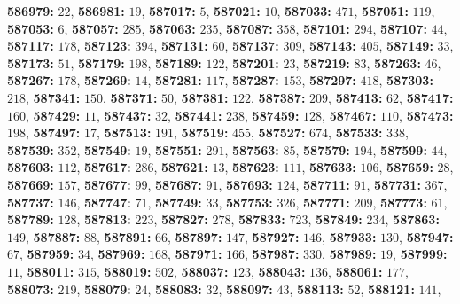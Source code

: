 \textsf{\bfseries 586979:} $22$, \textsf{\bfseries 586981:} $19$, \textsf{\bfseries 587017:} $5$, \textsf{\bfseries 587021:} $10$, \textsf{\bfseries 587033:} $471$, \textsf{\bfseries 587051:} $119$, \textsf{\bfseries 587053:} $6$, \textsf{\bfseries 587057:} $285$, \textsf{\bfseries 587063:} $235$, \textsf{\bfseries 587087:} $358$, \textsf{\bfseries 587101:} $294$, \textsf{\bfseries 587107:} $44$, \textsf{\bfseries 587117:} $178$, \textsf{\bfseries 587123:} $394$, \textsf{\bfseries 587131:} $60$, \textsf{\bfseries 587137:} $309$, \textsf{\bfseries 587143:} $405$, \textsf{\bfseries 587149:} $33$, \textsf{\bfseries 587173:} $51$, \textsf{\bfseries 587179:} $198$, \textsf{\bfseries 587189:} $122$, \textsf{\bfseries 587201:} $23$, \textsf{\bfseries 587219:} $83$, \textsf{\bfseries 587263:} $46$, \textsf{\bfseries 587267:} $178$, \textsf{\bfseries 587269:} $14$, \textsf{\bfseries 587281:} $117$, \textsf{\bfseries 587287:} $153$, \textsf{\bfseries 587297:} $418$, \textsf{\bfseries 587303:} $218$, \textsf{\bfseries 587341:} $150$, \textsf{\bfseries 587371:} $50$, \textsf{\bfseries 587381:} $122$, \textsf{\bfseries 587387:} $209$, \textsf{\bfseries 587413:} $62$, \textsf{\bfseries 587417:} $160$, \textsf{\bfseries 587429:} $11$, \textsf{\bfseries 587437:} $32$, \textsf{\bfseries 587441:} $238$, \textsf{\bfseries 587459:} $128$, \textsf{\bfseries 587467:} $110$, \textsf{\bfseries 587473:} $198$, \textsf{\bfseries 587497:} $17$, \textsf{\bfseries 587513:} $191$, \textsf{\bfseries 587519:} $455$, \textsf{\bfseries 587527:} $674$, \textsf{\bfseries 587533:} $338$, \textsf{\bfseries 587539:} $352$, \textsf{\bfseries 587549:} $19$, \textsf{\bfseries 587551:} $291$, \textsf{\bfseries 587563:} $85$, \textsf{\bfseries 587579:} $194$, \textsf{\bfseries 587599:} $44$, \textsf{\bfseries 587603:} $112$, \textsf{\bfseries 587617:} $286$, \textsf{\bfseries 587621:} $13$, \textsf{\bfseries 587623:} $111$, \textsf{\bfseries 587633:} $106$, \textsf{\bfseries 587659:} $28$, \textsf{\bfseries 587669:} $157$, \textsf{\bfseries 587677:} $99$, \textsf{\bfseries 587687:} $91$, \textsf{\bfseries 587693:} $124$, \textsf{\bfseries 587711:} $91$, \textsf{\bfseries 587731:} $367$, \textsf{\bfseries 587737:} $146$, \textsf{\bfseries 587747:} $71$, \textsf{\bfseries 587749:} $33$, \textsf{\bfseries 587753:} $326$, \textsf{\bfseries 587771:} $209$, \textsf{\bfseries 587773:} $61$, \textsf{\bfseries 587789:} $128$, \textsf{\bfseries 587813:} $223$, \textsf{\bfseries 587827:} $278$, \textsf{\bfseries 587833:} $723$, \textsf{\bfseries 587849:} $234$, \textsf{\bfseries 587863:} $149$, \textsf{\bfseries 587887:} $88$, \textsf{\bfseries 587891:} $66$, \textsf{\bfseries 587897:} $147$, \textsf{\bfseries 587927:} $146$, \textsf{\bfseries 587933:} $130$, \textsf{\bfseries 587947:} $67$, \textsf{\bfseries 587959:} $34$, \textsf{\bfseries 587969:} $168$, \textsf{\bfseries 587971:} $166$, \textsf{\bfseries 587987:} $330$, \textsf{\bfseries 587989:} $19$, \textsf{\bfseries 587999:} $11$, \textsf{\bfseries 588011:} $315$, \textsf{\bfseries 588019:} $502$, \textsf{\bfseries 588037:} $123$, \textsf{\bfseries 588043:} $136$, \textsf{\bfseries 588061:} $177$, \textsf{\bfseries 588073:} $219$, \textsf{\bfseries 588079:} $24$, \textsf{\bfseries 588083:} $32$, \textsf{\bfseries 588097:} $43$, \textsf{\bfseries 588113:} $52$, \textsf{\bfseries 588121:} $141$, 
